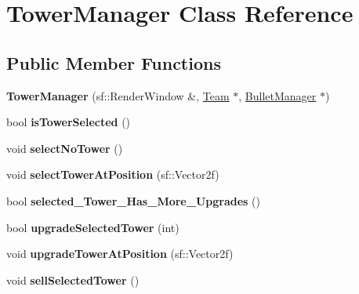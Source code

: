\hypertarget{class_tower_manager}{\section{Tower\+Manager Class Reference}
\label{class_tower_manager}
}
\subsection*{Public Member Functions}
\begin{DoxyCompactItemize}
\item 
\hypertarget{class_tower_manager_a1f1663a85eef7edb24e0a26f7bae1c1c}{{\bfseries Tower\+Manager} (sf\+::\+Render\+Window \&, \hyperlink{class_team}{Team} $\ast$, \hyperlink{class_bullet_manager}{Bullet\+Manager} $\ast$)}\label{class_tower_manager_a1f1663a85eef7edb24e0a26f7bae1c1c}

\item 
\hypertarget{class_tower_manager_aac418d74f30ce098e9ddf3f3dd49bb17}{bool {\bfseries is\+Tower\+Selected} ()}\label{class_tower_manager_aac418d74f30ce098e9ddf3f3dd49bb17}

\item 
\hypertarget{class_tower_manager_a63771ff9b43f5a919be281eaa478bf1a}{void {\bfseries select\+No\+Tower} ()}\label{class_tower_manager_a63771ff9b43f5a919be281eaa478bf1a}

\item 
\hypertarget{class_tower_manager_ab7043d85a8b7dfb5056b6d53c56a6aa4}{void {\bfseries select\+Tower\+At\+Position} (sf\+::\+Vector2f)}\label{class_tower_manager_ab7043d85a8b7dfb5056b6d53c56a6aa4}

\item 
\hypertarget{class_tower_manager_a4a26cc020133193aacd0a81e39e8bf5b}{bool {\bfseries selected\+\_\+\+Tower\+\_\+\+Has\+\_\+\+More\+\_\+\+Upgrades} ()}\label{class_tower_manager_a4a26cc020133193aacd0a81e39e8bf5b}

\item 
\hypertarget{class_tower_manager_a2c59d629ca693fb84145f414d24c52a2}{bool {\bfseries upgrade\+Selected\+Tower} (int)}\label{class_tower_manager_a2c59d629ca693fb84145f414d24c52a2}

\item 
\hypertarget{class_tower_manager_afec01174e87359014ca214a8f4495808}{void {\bfseries upgrade\+Tower\+At\+Position} (sf\+::\+Vector2f)}\label{class_tower_manager_afec01174e87359014ca214a8f4495808}

\item 
\hypertarget{class_tower_manager_a5ee047d5f6600d2aa24cf7bb4371324e}{void {\bfseries sell\+Selected\+Tower} ()}\label{class_tower_manager_a5ee047d5f6600d2aa24cf7bb4371324e}


\end{DoxyCompactItemize}
